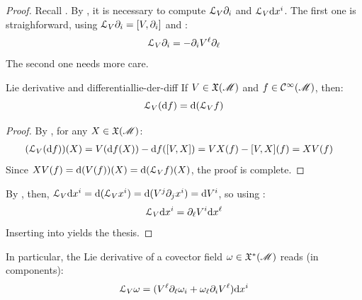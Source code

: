 \begin{proofbox}
  \begin{proof}
    Recall . By , it is necessary to compute $ \EuScript{L}_V \partial_i $ and $ \EuScript{L}_V \mathrm{d} x^i $. The first one is straighforward, using $ \EuScript{L}_V \partial_i = [V , \partial_i] $ and :
    \begin{equation}
      \EuScript{L}_V \partial_i = - \partial_i V^\ell \partial_\ell
    \end{equation}
    The second one needs more care.

    \begin{lemma}{Lie derivative and differential}{lie-der-diff}
      If $ V \in \mathfrak{X}(\mathscr{M}) $ and $ f \in \mathcal{C}^{\infty}(\mathscr{M}) $, then:
      \begin{equation}
        \EuScript{L}_V (\mathrm{d} f) = \mathrm{d} (\EuScript{L}_V f)
        \label{eq:lie-der-vec-basis}
      \end{equation}
    \end{lemma}

    \begin{proofbox}
      \begin{proof}
        By , for any $ X \in \mathfrak{X}(\mathscr{M}) $:
        \begin{equation*}
          \begin{split}
            (\EuScript{L}_V (\mathrm{d} f))(X)
            & = V(\mathrm{d} f(X)) - \mathrm{d} f([V,X]) = VX(f) - [V,X](f) = XV(f)
          \end{split}
        \end{equation*}
        Since $ XV(f) = \mathrm{d} (V(f))(X) = \mathrm{d} (\EuScript{L}_V f)(X) $, the proof is complete.
      \end{proof}
    \end{proofbox}

    By , then, $ \EuScript{L}_V \mathrm{d} x^i = \mathrm{d} (\EuScript{L}_V x^i) = \mathrm{d} (V^j \partial_j x^i) = \mathrm{d} V^i $, so using :
    \begin{equation}
      \EuScript{L}_V \mathrm{d} x^i = \partial_\ell V^i \mathrm{d} x^\ell
      \label{eq:lie-der-covec-basis}
    \end{equation}
    Inserting  into  yields the thesis.
  \end{proof}
\end{proofbox}

In particular, the Lie derivative of a covector field $ \omega \in \mathfrak{X}^*(\mathscr{M}) $ reads (in components):
\begin{equation}
  \EuScript{L}_V \omega = (V^\ell \partial_\ell \omega_i + \omega_\ell \partial_i V^\ell) \mathrm{d} x^i
  \label{eq:lie-der-covec}
\end{equation}

